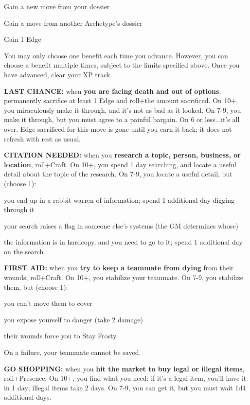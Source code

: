 \documentclass[oneside,10pt]{article}
\begin{document}
\begin{multicols}{2}
\begin{adjustwidth*}{.5cm}{.5cm}
\tcirc{} Gain a new move from your dossier

\tcirc{} Gain a move from another Archetype’s
dossier

\tcirc{} Gain 1 Edge

\end{adjustwidth*}

You may only choose one benefit each time you advance.
However, you can choose a benefit multiple times, subject
to the limits specified above. Once you have advanced, clear
your XP track.

\textbf{LAST CHANCE:} when \textbf{you are facing death and out of
options}, permanently sacrifice at least 1 Edge and roll+the
amount sacrificed. On 10+, you miraculously make it through,
and it’s not as bad as it looked. On 7-9, you make it through,
but you must agree to a painful bargain. On 6 or less...it’s all
over. Edge sacrificed for this move is gone until you earn it
back; it does not refresh with rest as usual.

\textbf{CITATION NEEDED:} when you \textbf{research a topic, person,
business, or location}, roll+Craft. On 10+, you spend 1 day
searching, and locate a useful detail about the topic of the
research. On 7-9, you locate a useful detail, but
(choose 1):
\begin{adjustwidth*}{.5cm}{.5cm}

\tcirc{} you end up in a rabbit warren of information; spend 1
additional day digging through it

\tcirc{} your search raises a flag in someone else’s systems (the
GM determines whose)

\tcirc{} the information is in hardcopy, and you need to go to it;
spend 1 additional day on the search
\end{adjustwidth*}

\textbf{FIRST AID:} when you \textbf{try to keep a teammate from dying}
from their wounds, roll+Craft. On 10+, you stabilize your
teammate. On 7-9, you stabilize them, but (choose
1):
\begin{adjustwidth*}{.5cm}{.5cm}

\tcirc{} you can’t move them to cover

\tcirc{} you expose yourself to danger (take 2
damage)

\tcirc{} their wounds force you to Stay Frosty
\end{adjustwidth*}

On a failure, your teammate cannot be saved.

\textbf{GO SHOPPING:} when you \textbf{hit the market to buy legal or illegal items}, roll+Presence. On 10+, you find what you need:
if it’s a legal item, you’ll have it in 1 day; illegal items take
2 days. On 7-9, you can get it, but you must wait 1d4 additional days.


\end{multicols}
\end{document}
